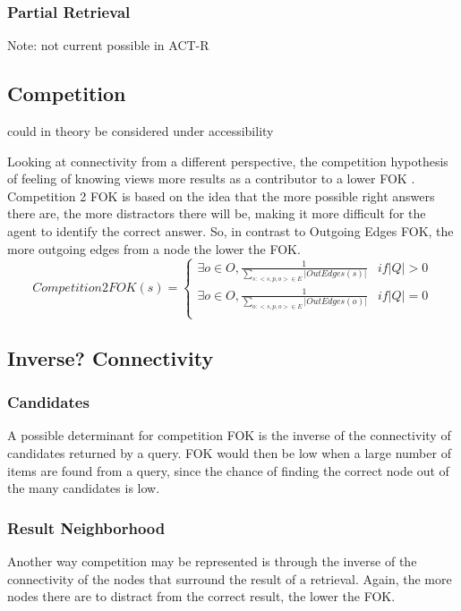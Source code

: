 \documentclass[10pt,letterpaper]{article}
\begin{document}
\subsubsection{Partial Retrieval}

Note: not current possible in ACT-R

\subsection{Competition}

could in theory be considered under accessibility

Looking at connectivity from a different perspective, the competition hypothesis of feeling of knowing views more results as a contributor to a lower FOK \cite{Schreiber1998TheRelationBetween}. Competition 2 FOK is based on the idea that the more possible right answers there are, the more distractors there will be, making it more difficult for the agent to identify the correct answer. So, in contrast to Outgoing Edges FOK, the more outgoing edges from a node the lower the FOK.
\noindent$$Competition2FOK(s) =
\begin{cases}
    \exists o{\in}O, \frac{1}{\sum\limits_{s: <s, p, o> \in E} {|OutEdges(s)|}} & {if |Q| > 0} \\
    \exists o{\in}O, \frac{1}{\sum\limits_{o: <s, p, o> \in E} {|OutEdges(o)|}} & {if |Q| = 0} \\
\end{cases}
$$

\subsection{Inverse? Connectivity}

\subsubsection{Candidates}
A possible determinant for competition FOK is the inverse of the connectivity of candidates returned by a query. FOK would then be low when a large number of items are found from a query, since the chance of finding the correct node out of the many candidates is low.


\subsubsection{Result Neighborhood}
Another way competition may be represented is through the inverse of the connectivity of the nodes that surround the result of a retrieval. Again, the more nodes there are to distract from the correct result, the lower the FOK.
\end{document}
